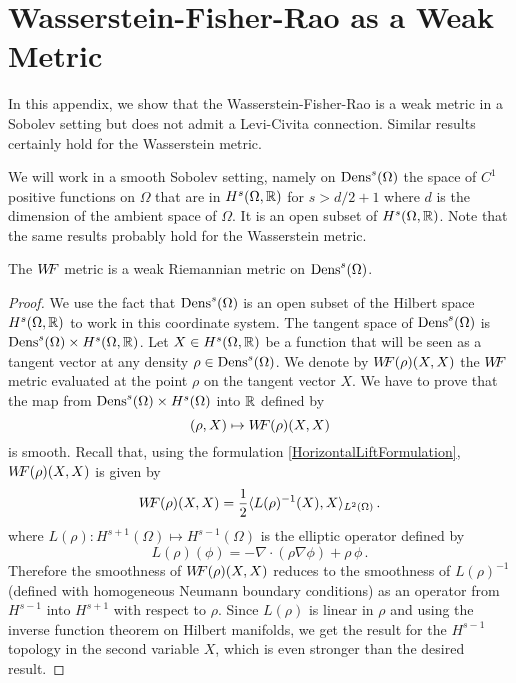 

\appendix
%
\section{Wasserstein-Fisher-Rao as a Weak Metric}\label{WFRasWeak}
In this appendix, we show that the Wasserstein-Fisher-Rao is a weak metric in a Sobolev setting but does not admit a Levi-Civita connection. Similar results certainly hold for the Wasserstein metric. 

We will work in a smooth Sobolev setting, namely on $\operatorname{Dens}^s(\Omega)$ the space of $C^1$ positive functions on $\Omega$ that are in $H^s(\Omega,\mathbb{R})$ for $s>d/2+1$ where $d $ is the dimension of the ambient space of $\Omega$. It is an open subset of $H^s(\Omega,\mathbb{R})$. 
Note that the same results probably hold for the Wasserstein metric.

\begin{proposition}
The $W\! \! F$ metric is a weak Riemannian metric on $\operatorname{Dens}^s(\Omega)$.
\end{proposition}

\begin{proof}
We use the fact that $\operatorname{Dens}^s(\Omega)$ is an open subset of the Hilbert space $H^s(\Omega,\mathbb{R})$ to work in this coordinate system.
The tangent space of $\operatorname{Dens}^s(\Omega)$ is $\operatorname{Dens}^s(\Omega) \times H^s(\Omega,\mathbb{R})$. 
Let $X \in H^s(\Omega,\mathbb{R})$ be a function that will be seen as a tangent vector at any density $\rho \in \operatorname{Dens}^s(\Omega)$. We denote by $W\! \! F(\rho)(X,X)$ the $W\! \! F$ metric evaluated at the point $\rho$ on the tangent vector $X$. We have to prove that the map from $\operatorname{Dens}^s(\Omega) \times H^s(\Omega)$ into $\mathbb{R}$ defined by
$$ (\rho,X) \mapsto W\! \! F(\rho)(X,X)$$ is smooth.
Recall that, using the formulation \eqref{HorizontalLiftFormulation}, $W\! \! F(\rho)(X,X)$ is given by
\begin{equation}
W\! \! F(\rho)(X,X) = \frac12 \langle L(\rho)^{-1}(X),X \rangle_{L^2(\Omega)}\,.
\end{equation}
where $L(\rho): H^{s+1}(\Omega) \mapsto H^{s-1}(\Omega)$ is the elliptic operator defined by 
\begin{equation}
L(\rho)(\phi) = -\nabla \cdot (\rho \nabla \phi) + \rho  \, \phi \,.
\end{equation} 
Therefore the smoothness of $W\! \! F(\rho)(X,X) $ reduces to the smoothness of $L(\rho)^{-1}$ (defined with homogeneous Neumann boundary conditions) as an operator from $H^{s-1}$ into $H^{s+1}$ with respect to $\rho$. Since $L(\rho)$ is linear in $\rho$ and using the inverse function theorem on Hilbert manifolds, we get the result for the $H^{s-1}$ topology in the second variable $X$, which is even stronger than the desired result.
\end{proof}

